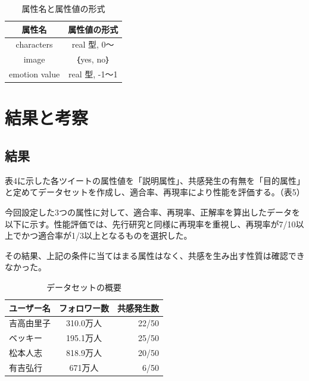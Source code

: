 \documentclass[dvipdfmx]{issj}
\begin{document}
\begin{table}[t]\centering
\caption{属性名と属性値の形式}\label{tbl:font}
\begin{small}
\begin{tabular}{|c|c|} \hline
属性名            & 属性値の形式\\\hline\hline
characters         & real 型, 0～\\\hline
image & ｛yes, no｝\\\hline
emotion value     &  real 型, -1～1\\\hline
\end{tabular}
\end{small}
\end{table}

\newpage


\section{結果と考察}  %


\subsection{結果}  %
表4に示した各ツイートの属性値を「説明属性」、共感発生の有無を「目的属性」と定めてデータセットを作成し、適合率、再現率により性能を評価する。（表5）

今回設定した3つの属性に対して、適合率、再現率、正解率を算出したデータを以下に示す。性能評価では、先行研究と同様に再現率を重視し、再現率が7/10以上でかつ適合率が1/3以上となるものを選択した。

その結果、上記の条件に当てはまる属性はなく、共感を生み出す性質は確認できなかった。



\begin{table}[t]
  \caption{データセットの概要}
  \label{table:data_type}
  \centering
  \begin{tabular}{lcr}
    \hline
   ユーザー名 & フォロワー数  &  共感発生数  \\
    \hline \hline
吉高由里子 & 310.0万人 &  22/50  \\
ベッキー & 195.1万人 &  25/50  \\
松本人志 & 818.9万人 &  20/50  \\
有吉弘行 & 671万人 &  6/50 \\
    \hline
  \end{tabular}
\end{table}
\end{document}
